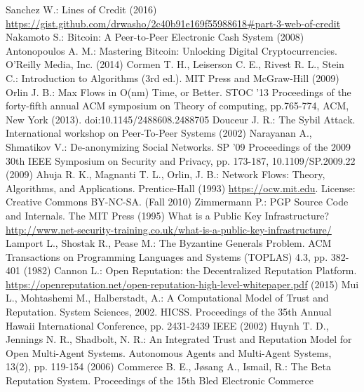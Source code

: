 \documentclass[11pt]{llncs}
\theoremstyle{definition}
\begin{document}
  \begin{thebibliography}{40}
     Sanchez W.: Lines of Credit (2016) \url{https://gist.github.com/drwasho/2c40b91e169f55988618#part-3-web-of-credit}
     Nakamoto S.: Bitcoin: A Peer-to-Peer Electronic Cash System (2008)
     Antonopoulos A. M.: Mastering Bitcoin: Unlocking Digital Cryptocurrencies. O'Reilly Media, Inc. (2014)
     Cormen T. H., Leiserson C. E., Rivest R. L., Stein C.: Introduction to Algorithms (3rd ed.). MIT Press and McGraw-Hill
     (2009)
     Orlin J. B.: Max Flows in O(nm) Time, or Better. STOC '13 Proceedings of the forty-fifth annual ACM symposium on Theory
     of computing, pp.765-774, ACM, New York (2013). doi:10.1145/2488608.2488705
     Douceur J. R.: The Sybil Attack. International workshop on Peer-To-Peer Systems (2002)
     Narayanan A., Shmatikov V.: De-anonymizing Social Networks. SP '09 Proceedings of the 2009 30th IEEE Symposium on
     Security and Privacy, pp. 173-187, 10.1109/SP.2009.22 (2009)
     Ahuja R. K., Magnanti T. L., Orlin, J. B.: Network Flows: Theory, Algorithms, and Applications. Prentice-Hall (1993)
     \url{https://ocw.mit.edu}. License: Creative Commons BY-NC-SA. (Fall 2010)
     Zimmermann P.: PGP Source Code and Internals. The MIT Press (1995)
     What is a Public Key Infrastructure? \url{http://www.net-security-training.co.uk/what-is-a-public-key-infrastructure/}
     Lamport L., Shostak R., Pease M.: The Byzantine Generals Problem. ACM Transactions on Programming Languages and Systems
     (TOPLAS) 4.3, pp. 382-401 (1982)
     Cannon L.: Open Reputation: the Decentralized Reputation Platform.
     \url{https://openreputation.net/open-reputation-high-level-whitepaper.pdf} (2015)
     Mui L., Mohtashemi M., Halberstadt, A.: A Computational Model of Trust and Reputation. System Sciences, 2002. HICSS.
     Proceedings of the 35th Annual Hawaii International Conference, pp. 2431-2439 IEEE (2002)
     Huynh T. D., Jennings N. R., Shadbolt, N. R.: An Integrated Trust and Reputation Model for Open Multi-Agent Systems.
     Autonomous Agents and Multi-Agent Systems, 13(2), pp. 119-154 (2006)
     Commerce B. E., Jøsang A., Ismail, R.: The Beta Reputation System. Proceedings of the 15th Bled Electronic Commerce

\end{thebibliography}
\end{document}
